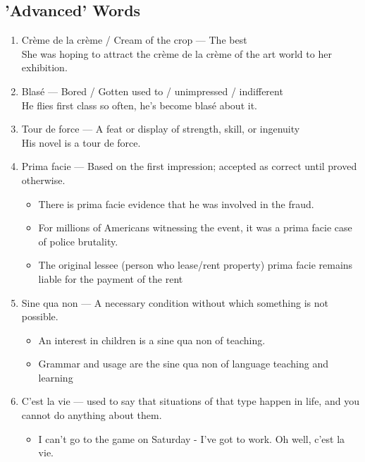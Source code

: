 \documentclass[oneside]{book}
\begin{document}
\subsection{'Advanced' Words}
\begin{enumerate}
    \item Crème de la crème / Cream of the crop --- The best\\
    \footnotesize She was hoping to attract the crème de la crème of the art world to her exhibition. \normalsize
    \item Blasé --- Bored / Gotten used to / unimpressed / indifferent\\
    \footnotesize He flies first class so often, he's become blasé about it.\normalsize
    \item Tour de force --- A feat or display of strength, skill, or ingenuity\\
    \footnotesize His novel is a tour de force. \normalsize
    \item Prima facie --- Based on the first impression; accepted as correct until proved otherwise. \footnotesize
    \begin{itemize}
        \item There is prima facie evidence that he was involved in the fraud.
        \item For millions of Americans witnessing the event, it was a prima facie case of police brutality.
        \item The original lessee (person who lease/rent property) prima facie remains liable for the payment of the rent
    \end{itemize} \normalsize
    \item Sine qua non --- A necessary condition without which something is not possible.\footnotesize
    \begin{itemize}
        \item An interest in children is a sine qua non of teaching.
        \item Grammar and usage are the sine qua non of language teaching and learning
    \end{itemize} \normalsize
    \item C'est la vie --- used to say that situations of that type happen in life, and you cannot do anything about them.
    \footnotesize
    \begin{itemize}
        \item I can't go to the game on Saturday - I've got to work. Oh well, c'est la vie. 
    \end{itemize} \normalsize

\end{enumerate}
\end{document}

